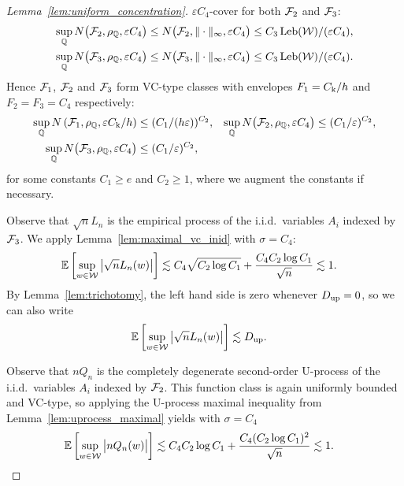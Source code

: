 \begin{proof}[Lemma~\ref{lem:uniform_concentration}]
  $\varepsilon C_4$-cover for both $\mathcal{F}_2$ and $\mathcal{F}_3$:
  \begin{align*}
    \sup_{\mathbb{Q}}
    N\big(\mathcal{F}_2, \rho_{\mathbb{Q}}, \varepsilon C_4 \big)
    &\leq
    N\big(\mathcal{F}_2, \|\cdot\|_\infty, \varepsilon C_4 \big)
    \leq
    C_3 \operatorname{Leb}(\mathcal{W}) / (\varepsilon C_4), \\
    \sup_{\mathbb{Q}}
    N\big(\mathcal{F}_3, \rho_{\mathbb{Q}}, \varepsilon C_4 \big)
    &\leq
    N\big(\mathcal{F}_3, \|\cdot\|_\infty, \varepsilon C_4 \big)
    \leq
    C_3 \operatorname{Leb}(\mathcal{W}) / (\varepsilon C_4).
  \end{align*}
  Hence
  $\mathcal{F}_1$,
  $\mathcal{F}_2$ and
  $\mathcal{F}_3$
  form VC-type classes with envelopes
  $F_1 = C_\mathrm{k} / h$ and
  $F_2 = F_3 = C_4$ respectively:
  \begin{align*}
    \sup_{\mathbb{Q}}
    N\left(\mathcal{F}_1, \rho_{\mathbb{Q}},
      \varepsilon C_\mathrm{k} / h \right)
    &\leq
    (C_1/(h\varepsilon))^{C_2},
    &\sup_{\mathbb{Q}}
    N\big(\mathcal{F}_2, \rho_{\mathbb{Q}}, \varepsilon C_4 \big)
    &\leq
    (C_1/\varepsilon)^{C_2}, \\
    \sup_{\mathbb{Q}}
    N\big(\mathcal{F}_3, \rho_{\mathbb{Q}}, \varepsilon C_4 \big)
    &\leq
    (C_1/\varepsilon)^{C_2},
  \end{align*}
  for some constants $C_1 \geq e$ and $C_2 \geq 1$,
  where we augment the constants if necessary.


  Observe that
  $\sqrt{n}L_n$
  is the empirical process of the i.i.d.\ variables $A_i$
  indexed by $\mathcal{F}_3$.
  We apply Lemma~\ref{lem:maximal_vc_inid}
  with $\sigma = C_4$:
  \begin{align*}
    \mathbb{E} \left[
      \sup_{w \in \mathcal{W}}
      \big| \sqrt{n} L_
      n(w) \big|
    \right]
    &\lesssim
    C_4
    \sqrt{C_2 \log C_1}
    +
    \frac{C_4 C_2 \log C_1}
    {\sqrt{n}}
    \lesssim 1.
  \end{align*}
  By Lemma~\ref{lem:trichotomy},
  the left hand side is zero whenever
  $D_{\textup{up}} = 0$,
  so we can also write
  \begin{align*}
    \mathbb{E} \left[
      \sup_{w \in \mathcal{W}}
      \big| \sqrt{n} L_n(w) \big|
    \right]
    &\lesssim
    D_{\textup{up}}.
  \end{align*}


  Observe that $n Q_n$
  is the completely degenerate second-order U-process
  of the i.i.d.\ variables $A_i$
  indexed by $\mathcal{F}_2$.
  This function class is again uniformly bounded
  and VC-type,
  so applying the U-process maximal inequality from
  Lemma~\ref{lem:uprocess_maximal}
  yields with $\sigma = C_4$
  \begin{align*}
    \mathbb{E} \left[
      \sup_{w \in \mathcal{W}}
      \big| n Q_n(w) \big|
    \right]
    &\lesssim
    C_4
    C_2 \log C_1
    +
    \frac{C_4 (C_2 \log C_1)^2}
    {\sqrt{n}}
    \lesssim 1.
  \end{align*}


\end{proof}
